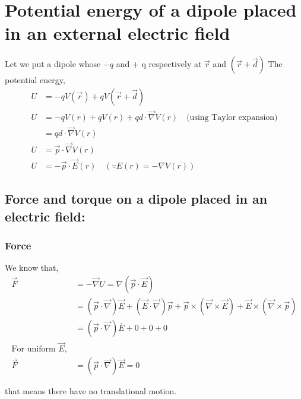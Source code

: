 \section{Potential energy of a dipole placed in an external electric field}
Let we put a dipole whose $-q$ and $+$ q respectively at $\vec{r}$ and $(\vec{r}+\vec{d})$
The potential energy,
\begin{align*}
U&=-q V(\vec{r})+q V(\vec{r}+\vec{d})\\
U&=-q V(r)+q V(r)+q d \cdot \vec{\nabla} V(r)\quad \text{(using Taylor expansion)}\\
&=q d \cdot \vec{\nabla} V(r) \\
U&=\vec{p} \cdot \vec{\nabla} V(r) \\
U&=-\vec{p} \cdot \vec{E}(r) \quad(\because E(r)=-\nabla V(r))
\end{align*}
\subsection{Force and torque on a dipole placed in an electric field:}
\subsubsection{Force }
We know that,
\begin{align*}
\vec{F} &=-\vec{\nabla} U=\nabla(\vec{p} \cdot \vec{E}) \\
&=(\vec{p} \cdot \vec{\nabla}) \vec{E}+(\vec{E} \cdot \vec{\nabla}) \vec{p}+\vec{p} \times(\vec{\nabla} \times \vec{E})+\vec{E} \times(\vec{\nabla} \times \vec{p}) \\
&=(\vec{p} \cdot \vec{\nabla}) \bar{E}+0+0+0\\
\text{For uniform } \vec{E},\\
\vec{F}&=(\vec{p} \cdot \vec{\nabla}) \vec{E}=0
\end{align*}

that means there have no translational motion.
